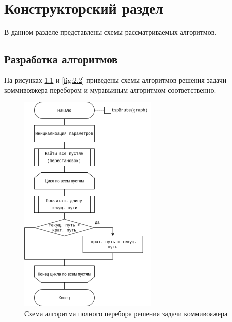 \chapter{Конструкторский раздел}
\label{cha:design}

В данном разделе представлены схемы рассматриваемых алгоритмов.

\section{Разработка алгоритмов}

На рисунках \ref{fig:2.1} и \ref{fig:2.2} приведены схемы алгоритмов решения задачи
коммивояжера перебором и муравьиным алгоритмом соответственно.

\begin{figure}[h!]
    \centering
    \includegraphics[width=0.6\textwidth]{6/inc/d1.png}
    \caption{Схема алгоритма полного перебора решения задачи коммивояжера}
    \label{fig:2.1}
\end{figure}

